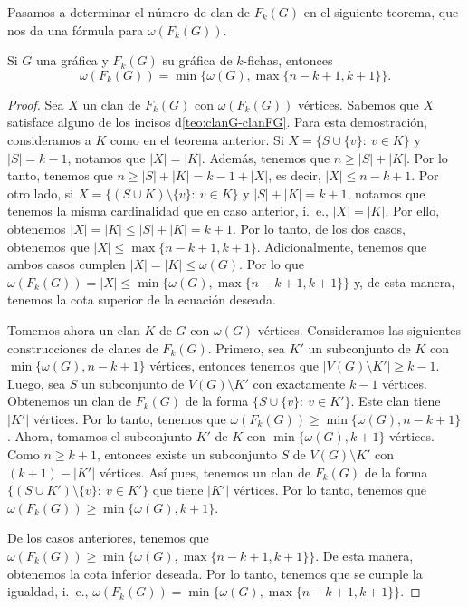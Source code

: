 Pasamos a determinar el n\'umero de clan de $F_k(G)$ en el siguiente teorema,
que nos da una f\'ormula para $\omega(F_k(G))$.
            
\begin{teorema}
\label{teo:clan-max}
    Si $G$ una gr\'afica y $F_k(G)$ su gr\'afica de $k$-fichas, entonces
    \[
    \omega(F_k(G))= \min \{\omega(G), \max \{n-k+1,k+1\}\}.
    \]
\end{teorema}

\begin{proof}
    Sea $X$ un clan de $F_k(G)$ con $\omega(F_k(G))$ v\'ertices. Sabemos que $X$
    satisface alguno de los incisos d\cref{teo:clanG-clanFG}. Para esta
    demostraci\'on, consideramos a $K$ como en el teorema anterior.   Si $X =
    \{S \cup \{v\} \colon\ v \in K\}$ y $|S| = k-1$, notamos que $|X| = |K|$.
    Adem\'as, tenemos que $n \geq |S| + |K|$. Por lo tanto, tenemos que $n \geq
    |S| + |K| = k-1 + |X|$, es decir, $|X| \leq n-k+1$. Por otro lado, si 
    \linebreak
    $X = \{(S\cup K) \setminus \{v\} \colon\ v \in K \}$ y $|S| + |K| = k+1$,
    notamos que tenemos la misma cardinalidad que en caso anterior, i.~e., $|X|
    =|K|$. Por ello, obtenemos $|X| = |K| \leq |S| + |K| = k+1$. Por lo tanto,
    de los dos casos, obtenemos que $|X| \leq \max\{n-k+1, k+1\}$.
    Adicionalmente, tenemos que ambos casos cumplen $|X| = |K| \leq \omega(G)$.
    Por lo que $\omega(F_k(G)) = |X| \leq \min \{\omega(G), \max \{n-k+1,
    k+1\}\}$ y, de esta manera, tenemos la cota superior de la ecuaci\'on
    deseada.

    Tomemos ahora un clan $K$ de $G$ con $\omega(G)$ v\'ertices. Consideramos
    las siguientes construcciones de clanes de $F_k(G)$. Primero, sea $K'$ un
    subconjunto de $K$ con $\min\{\omega(G),n-k+1\}$ v\'ertices, entonces
    tenemos que $|V(G) \setminus K'| \geq k-1$. Luego, sea $S$ un subconjunto de
    $V(G) \setminus K'$ con exactamente $k-1$ v\'ertices. Obtenemos un clan de
    $F_k(G)$ de la forma $\{ S \cup \{v\} \colon\ v \in K'\}$. Este clan tiene
    $|K'|$ v\'ertices. Por lo tanto, tenemos que $\omega(F_k(G)) \geq \min
    \{\omega(G), n-k+1\}$. Ahora, tomamos el subconjunto $K'$ de $K$ con $\min
    \{ \omega(G), k+1\}$ v\'ertices. Como $n \geq k+1$, entonces existe un
    subconjunto $S$ de $V(G) \setminus K'$ con $(k+1)-|K'|$ v\'ertices. As\'i
    pues, tenemos un clan de $F_k(G)$ de la forma $\{ (S \cup K') \setminus
    \{v\} \colon\ v \in K'\}$ que tiene $|K'|$ v\'ertices. Por lo tanto, tenemos
    que $\omega(F_k(G)) \geq \min \{\omega(G), k+1\}$.

    De los casos anteriores, tenemos que $\omega(F_k(G)) \geq  \min \{\omega(G),
    \max \{n-k+1,k+1\}\}$. De esta manera, obtenemos la cota inferior deseada.
    Por lo tanto, tenemos que se cumple la igualdad, i.~e., $\omega(F_k(G))=
    \min \{\omega(G), \max \{n-k+1,k+1\}\}$.
\end{proof}

